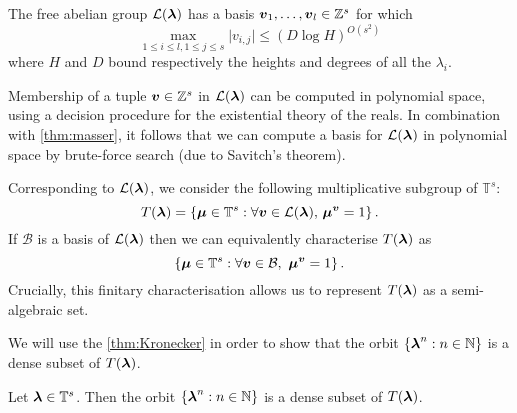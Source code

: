 \begin{theorem}[Masser]
\label{thm:masser}
The free abelian group ${\cal{L}}(\boldsymbol{\lambda})$ has a basis $\boldsymbol{v}_1, \ldots, \boldsymbol{v}_{l} \in \mathbb{Z}^{s}$ for which
\[ \max\limits_{1\leq i\leq l,1\leq j\leq s} \lvert v_{i,j} \rvert \leq (D\log H)^{O(s^2)} \]
where $H$ and $D$ bound respectively the heights and degrees of all the $\lambda_{i}$.
\end{theorem}
Membership of a tuple $\boldsymbol{v}\in \mathbb{Z}^{s}$ in ${\cal{L}}(\boldsymbol{\lambda})$ can be computed in polynomial space, using a decision procedure for the existential theory of the reals. In combination with \cref{thm:masser}, it follows that we can compute a basis for ${\cal{L}}(\boldsymbol{\lambda})$ in polynomial space by brute-force search (due to Savitch's theorem).

Corresponding to ${\cal{L}}(\boldsymbol{\lambda})$, we consider the following
multiplicative subgroup of $\mathbb{T}^{s}$:
\begin{equation*}
T(\boldsymbol{\lambda})=\lbrace \boldsymbol{\mu} \in \mathbb{T}^{s} : \forall \boldsymbol{v} \in {\cal{L}}(\boldsymbol{\lambda}), \, \boldsymbol{\mu}^{\boldsymbol{v}} = 1 \rbrace \, .
\end{equation*}
If $\mathcal{B}$ is a basis of ${\cal{L}}(\boldsymbol{\lambda})$ then we can
equivalently characterise $T(\boldsymbol{\lambda})$ as
\begin{equation*}
\lbrace \boldsymbol{\mu} \in \mathbb{T}^{s}: \forall \boldsymbol{v} \in \mathcal{B}, \, \, \boldsymbol{\mu}^{\boldsymbol{v}} = 1 \rbrace \, .
\end{equation*}
Crucially, this finitary characterisation allows us to represent $T(\boldsymbol\lambda)$ as a semi-algebraic set.

We will use the \cref{thm:Kronecker} in order to show that the orbit $\lbrace 
\boldsymbol\lambda^n : n\in\mathbb{N} \rbrace$ is a dense subset of
$T(\boldsymbol{\lambda})$.

\begin{theorem}
\label{dense}
Let $\boldsymbol{\lambda}\in\mathbb{T}^s$. Then the orbit $\lbrace \boldsymbol\lambda^n : n\in\mathbb{N} \rbrace$ is a dense subset of $T(\boldsymbol{\lambda})$.
\end{theorem}


